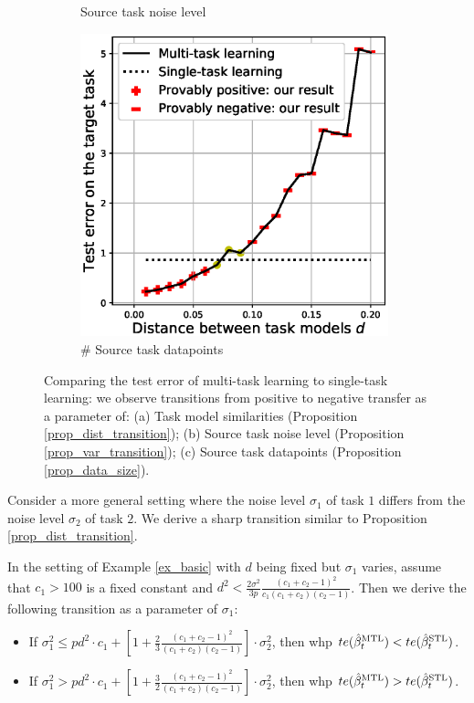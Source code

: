 \begin{figure}
\begin{subfigure}[b]{0.31\textwidth}
		\caption{Source task noise level}
	\end{subfigure}\hfill
	\begin{subfigure}[b]{0.31\textwidth}
		\centering
		\includegraphics[width=0.98\textwidth]{figures/model_shift_phase_transition.eps}
		\caption{\# Source task datapoints}
	\end{subfigure}
	\caption{Comparing the test error of multi-task learning to single-task learning: we observe transitions from positive to negative transfer as a parameter of: (a) Task model similarities (Proposition \ref{prop_dist_transition}); (b) Source task noise level (Proposition \ref{prop_var_transition}); (c) Source task datapoints (Proposition \ref{prop_data_size}).}
	\label{fig_model_shift_phasetrans}
\end{figure}


Consider a more general setting where the noise level $\sigma_1$ of task $1$ differs from the noise level $\sigma_2$ of task $2$.
We derive a sharp transition similar to Proposition \ref{prop_dist_transition}.

\begin{proposition}\label{prop_var_transition}
	In the setting of Example \ref{ex_basic} with $d$ being fixed but $\sigma_1$ varies, assume that $c_1 > 100$ is a fixed constant and $d^2 < \frac {2\sigma^2} {3p} \frac{(c_1 + c_2 -1)^2}{c_1 (c_1 + c_2)(c_2 - 1)}$. Then we derive the following transition as a parameter of $\sigma_1$:
	\begin{itemize}
		\item If $\sigma_1^2 \le p d^2 \cdot c_1 +\left[1+ \frac23\frac{(c_1 + c_2 - 1)^2}{(c_1 + c_2) (c_2 - 1)}\right]\cdot\sigma_2^2$, then whp $te(\hat{\beta}_t^{\text{MTL}}) < te(\hat{\beta}_t^{\text{STL}})$.
		\item If $\sigma_1^2 > p d^2 \cdot c_1 +\left[1+ \frac32\frac{(c_1 + c_2 - 1)^2}{(c_1 + c_2) (c_2 - 1)}\right] \cdot \sigma_2^2$, then whp $te(\hat{\beta}_t^{\text{MTL}}) > te(\hat{\beta}_t^{\text{STL}})$.
	\end{itemize}
\end{proposition}

